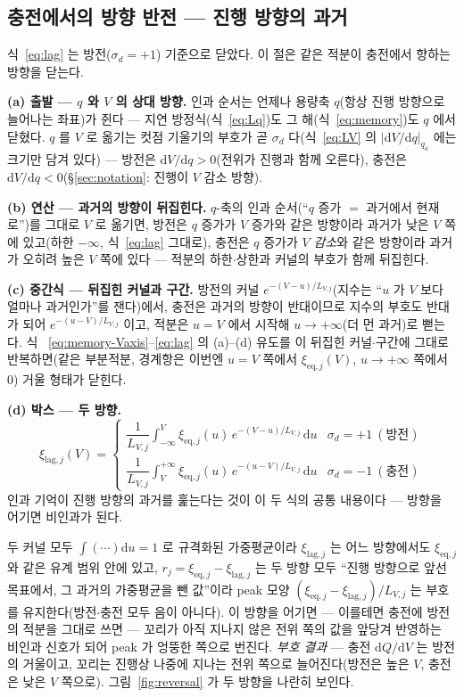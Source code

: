 \documentclass[11pt,a4paper]{article}
\newcommand{\dd}{\mathrm{d}}
\newcommand{\eq}{\mathrm{eq}}
\begin{document}
\subsection{충전에서의 방향 반전 --- 진행 방향의 과거}
식~\eqref{eq:lag} 는 방전($\sigma_d=+1$) 기준으로 닫았다. 이 절은 같은 적분이 충전에서 향하는 방향을
닫는다.

\textbf{(a) 출발 --- $q$ 와 $V$ 의 상대 방향.} 인과 순서는 언제나 용량축 $q$(항상 진행 방향으로
늘어나는 좌표)가 쥔다 --- 지연 방정식(식~\eqref{eq:Lq})도 그 해(식~\eqref{eq:memory})도 $q$ 에서
닫혔다. $q$ 를 $V$ 로 옮기는 컷점 기울기의 부호가 곧 $\sigma_d$ 다(식~\eqref{eq:LV} 의
$|\dd V/\dd q|_{q_a}$ 에는 크기만 담겨 있다) --- 방전은 $\dd V/\dd q>0$(전위가 진행과 함께 오른다),
충전은 $\dd V/\dd q<0$(\S\ref{sec:notation}: 진행이 $V$ 감소 방향).

\textbf{(b) 연산 --- 과거의 방향이 뒤집힌다.} $q$-축의 인과 순서(``$q$ 증가 $=$ 과거에서 현재로'')를
그대로 $V$ 로 옮기면, 방전은 $q$ 증가가 $V$ 증가와 같은 방향이라 과거가 낮은 $V$ 쪽에 있고(하한
$-\infty$, 식~\eqref{eq:lag} 그대로), 충전은 $q$ 증가가 $V$ \emph{감소}와 같은 방향이라 과거가 오히려
높은 $V$ 쪽에 있다 --- 적분의 하한$\cdot$상한과 커널의 부호가 함께 뒤집힌다.

\textbf{(c) 중간식 --- 뒤집힌 커널과 구간.} 방전의 커널 $e^{-(V-u)/L_{V,j}}$(지수는 ``$u$ 가 $V$ 보다
얼마나 과거인가''를 잰다)에서, 충전은 과거의 방향이 반대이므로 지수의 부호도 반대가 되어
$e^{-(u-V)/L_{V,j}}$ 이고, 적분은 $u=V$ 에서 시작해 $u\to+\infty$(더 먼 과거)로 뻗는다. 식
~\eqref{eq:memory-Vaxis}--\eqref{eq:lag} 의 (a)--(d) 유도를 이 뒤집힌 커널$\cdot$구간에 그대로
반복하면(같은 부분적분, 경계항은 이번엔 $u=V$ 쪽에서 $\xi_{\eq,j}(V)$, $u\to+\infty$ 쪽에서 $0$)
거울 형태가 닫힌다.

\textbf{(d) 박스 --- 두 방향.}
\begin{equation}
\boxed{\;
\xi_{\mathrm{lag},j}(V)=
\begin{cases}
\dfrac{1}{L_{V,j}}\displaystyle\int_{-\infty}^{V} \xi_{\eq,j}(u)\,e^{-(V-u)/L_{V,j}}\,\dd u
& \sigma_d=+1\ (\text{방전})\\[12pt]
\dfrac{1}{L_{V,j}}\displaystyle\int_{V}^{+\infty} \xi_{\eq,j}(u)\,e^{-(u-V)/L_{V,j}}\,\dd u
& \sigma_d=-1\ (\text{충전})
\end{cases}\;}
\label{eq:reversal}
\end{equation}
인과 기억이 진행 방향의 과거를 훑는다는 것이 이 두 식의 공통 내용이다 --- 방향을 어기면 비인과가
된다.

두 커널 모두 $\int(\cdots)\dd u=1$ 로 규격화된 가중평균이라 $\xi_{\mathrm{lag},j}$ 는 어느 방향에서도
$\xi_{\eq,j}$ 와 같은 유계 범위 안에 있고, $r_j=\xi_{\eq,j}-\xi_{\mathrm{lag},j}$ 는 두 방향 모두
``진행 방향으로 앞선 목표에서, 그 과거의 가중평균을 뺀 값''이라 peak 모양
$(\xi_{\eq,j}-\xi_{\mathrm{lag},j})/L_{V,j}$ 는 부호를 유지한다(방전$\cdot$충전 모두 음이 아니다).
이 방향을 어기면 --- 이를테면 충전에 방전의 적분을 그대로 쓰면 --- 꼬리가 아직 지나지 않은 전위
쪽의 값을 앞당겨 반영하는 비인과 신호가 되어 peak 가 엉뚱한 쪽으로 번진다. \emph{부호 결과} ---
충전 $\dd Q/\dd V$ 는 방전의 거울이고, 꼬리는 진행상 나중에 지나는 전위 쪽으로 늘어진다(방전은 높은
$V$, 충전은 낮은 $V$ 쪽으로). 그림~\ref{fig:reversal} 가 두 방향을 나란히 보인다.
\end{document}
